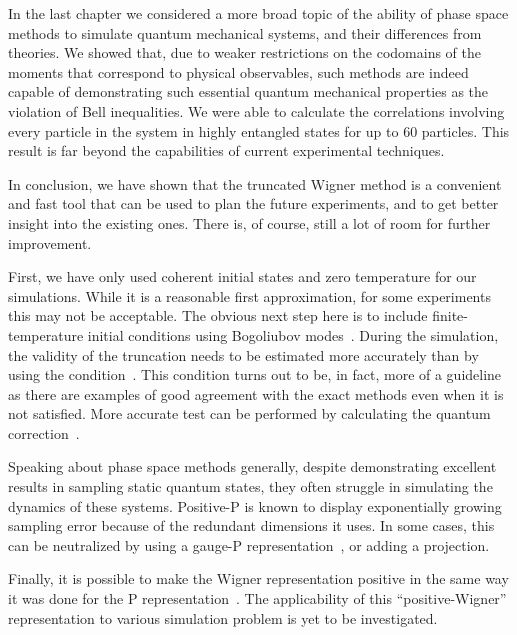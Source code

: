 In the last chapter we considered a more broad topic of the ability of phase space methods to simulate quantum mechanical systems, and their differences from  theories.
We showed that, due to weaker restrictions on the codomains of the moments that correspond to physical observables, such methods are indeed capable of demonstrating such essential quantum mechanical properties as the violation of Bell inequalities.
We were able to calculate the correlations involving every particle in the system in highly entangled  states for up to $60$ particles.
This result is far beyond the capabilities of current experimental techniques.

\centerline{\vfleuron}

In conclusion, we have shown that the truncated Wigner method is a convenient and fast tool that can be used to plan the future experiments, and to get better insight into the existing ones.
There is, of course, still a lot of room for further improvement.

First, we have only used coherent initial states and zero temperature for our simulations.
While it is a reasonable first approximation, for some experiments this may not be acceptable.
The obvious next step here is to include finite-temperature initial conditions using Bogoliubov modes~\cite{Steel1998,Sinatra2002,Ruostekoski2005,Isella2006,Blakie2008}.
During the simulation, the validity of the truncation needs to be estimated more accurately than by using the condition~.
This condition turns out to be, in fact, more of a guideline as there are examples of good agreement with the exact methods even when it is not satisfied.
More accurate test can be performed by calculating the quantum correction~\cite{Polkovnikov2010}.

Speaking about phase space methods generally, despite demonstrating excellent results in sampling static quantum states, they often struggle in simulating the dynamics of these systems.
Positive-P is known to display exponentially growing sampling error because of the redundant dimensions it uses.
In some cases, this can be neutralized by using a gauge-P representation~\cite{Deuar2002,Deuar2005a}, or adding a projection.

Finally, it is possible to make the Wigner representation positive in the same way it was done for the P representation~\cite{Plimak2001}.
The applicability of this ``positive-Wigner'' representation to various simulation problem is yet to be investigated.
